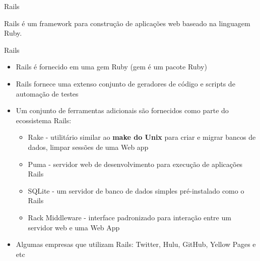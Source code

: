 \begin{frame}{Rails}
	\begin{center}
		\large Rails é um \alert{framework} para construção de \alert{aplicações web} baseado na \alert{linguagem Ruby}.
	\end{center}
\end{frame}
\begin{frame}[t, fragile]{Rails}
	\begin{itemize}
		\item Rails é fornecido em uma \alert{gem} Ruby (gem é um pacote Ruby)
		\item Rails fornece uma extenso conjunto de geradores de código e scripts de automação de testes
		\item Um conjunto de ferramentas adicionais são fornecidos como parte do ecossistema Rails:
		\begin{itemize}
			\item \alert{Rake} - utilitário similar ao \textbf{make do Unix} para criar e migrar bancos de dados, limpar sessões de uma Web app
			\item \alert{Puma} - servidor web de desenvolvimento para execução de aplicações Rails
			\item \alert{SQLite} - um servidor de banco de dados simples pré-instalado como o Rails
			\item \alert{Rack Middleware} - interface padronizado para interação entre um servidor web e uma Web App
		\end{itemize}
		\item Algumas empresas que utilizam Rails: Twitter, Hulu, GitHub, Yellow Pages e etc
	\end{itemize}
\end{frame}
